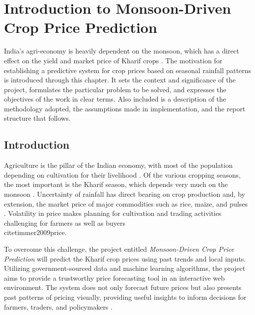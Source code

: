 \chapter{Introduction to Monsoon-Driven Crop Price Prediction}
India's agri-economy is heavily dependent on the monsoon, which has a direct effect on the yield and market price of Kharif crops \cite{gadgil2006monsoon, sarkar2019monsoon}. The motivation for establishing a predictive system for crop prices based on seasonal rainfall patterns is introduced through this chapter. It sets the context and significance of the project, formulates the particular problem to be solved, and expresses the objectives of the work in clear terms. Also included is a description of the methodology adopted, the assumptions made in implementation, and the report structure that follows.
\section[Introduction]{\textbf{Introduction}}

Agriculture is the pillar of the Indian economy, with most of the population depending on cultivation for their livelihood \cite{birthal2015}. Of the various cropping seasons, the most important is the Kharif season, which depends very much on the monsoon \cite{gadgil2006monsoon}. Uncertainty of rainfall has direct bearing on crop production and, by extension, the market price of major commodities such as rice, maize, and pulses \cite{ray2019climate}. Volatility in price makes planning for cultivation and trading activities challenging for farmers as well as buyers \\cite{timmer2009price}.

To overcome this challenge, the project entitled \textit{Monsoon-Driven Crop Price Prediction} will predict the Kharif crop prices using past trends and local inputs. Utilizing government-sourced data and machine learning algorithms, the project aims to provide a trustworthy price forecasting tool in an interactive web environment. The system does not only forecast future prices but also presents past patterns of pricing visually, providing useful insights to inform decisions for farmers, traders, and policymakers \cite{jain2020deep, mahmud2025price}.

